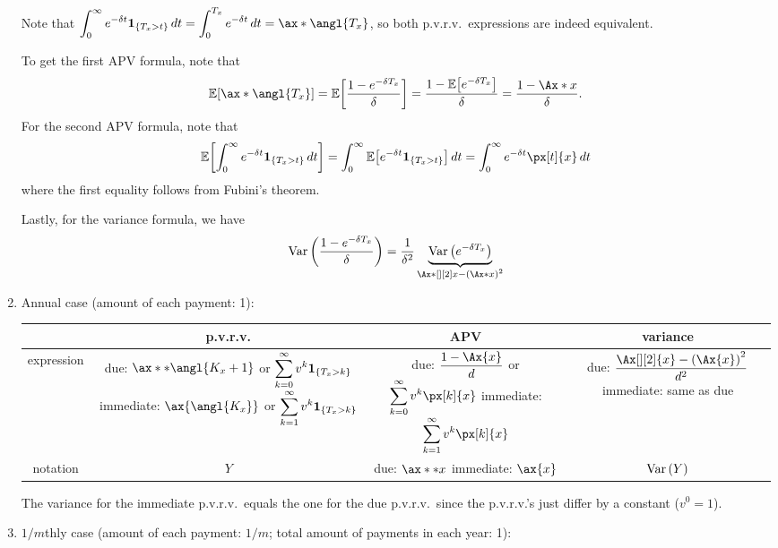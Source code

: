 \begin{enumerate}
\begin{note}
Note that \(\displaystyle \int_{0}^{\infty}e^{-\delta t}\indicset{T_x>t}\,dt
=\int_{0}^{T_x}e^{-\delta t}\,dt
=\ax*{\angl{T_x}}\), so both p.v.r.v.\ expressions are indeed equivalent.
\end{note}


\begin{pf}
To get the first APV formula, note that
\[
\expv{\ax*{\angl{T_x}}}=\expv{\frac{1-e^{-\delta T_x}}{\delta}}
=\frac{1-\expv{e^{-\delta T_x}}}{\delta}
=\frac{1-\Ax*{x}}{\delta}.
\]
For the second APV formula, note that
\[
\expv{\int_{0}^{\infty}e^{-\delta t}\indicset{T_x>t}\,dt}
=\int_{0}^{\infty}\expv{e^{-\delta t}\indicset{T_x>t}}\,dt
=\int_{0}^{\infty}e^{-\delta t}\px[t]{x}\,dt
\]
where the first equality follows from Fubini's theorem.

Lastly, for the variance formula, we have
\[
\vari{\frac{1-e^{-\delta T_x}}{\delta}}=\frac{1}{\delta^2}
\underbrace{\vari{e^{-\delta T_x}}}_{\Ax*[][2]{x}-\qty(\Ax*{x})^2}
\]
\end{pf}

\item \label{it:ann-wl-annuity-fmlas}
Annual case (amount of each payment: 1):

\begin{tabular}{cccc}
\toprule
&p.v.r.v.&APV&variance\\
\midrule
expression&
\makecell{
due: \(\ax**{\angl{K_x+1}}\) or \(\displaystyle\sum_{k=0}^{\infty}v^k\mathbf{1}_{\left\{T_x>k\right\}}\)\\
immediate: \(\ax{\angl{K_x}}\) or \(\displaystyle\sum_{k=1}^{\infty}v^k\mathbf{1}_{\left\{T_x>k\right\}}\)
}
&\makecell{
due: \(\displaystyle \frac{1-\Ax{x}}{d}\) or \(\displaystyle\sum_{k=0}^{\infty}v^k\px[k]{x}\)\\
immediate: \(\displaystyle\sum_{k=1}^{\infty}v^k\px[k]{x}\)
}
&\makecell{due: \(\displaystyle \frac{\Ax[][2]{x}-\qty(\Ax{x})^2}{d^2}\)\\
immediate: same as due
}\\
notation&\(Y\)&
\makecell{due: \(\ax**{x}\)\\
immediate: \(\ax{x}\)}&\(\operatorname{Var}\qty(Y)\)\\
\bottomrule
\end{tabular}
\begin{note}
The variance for the immediate p.v.r.v.\ equals the one for the due p.v.r.v.\
since the p.v.r.v.'s just differ by a constant (\(v^{0}=1\)).
\end{note}


\item \label{it:1m-wl-annuity-fmlas}
\(1/m\)thly case (amount of each payment: \(1/m\); total amount of payments in
each year:  1):


\end{enumerate}
